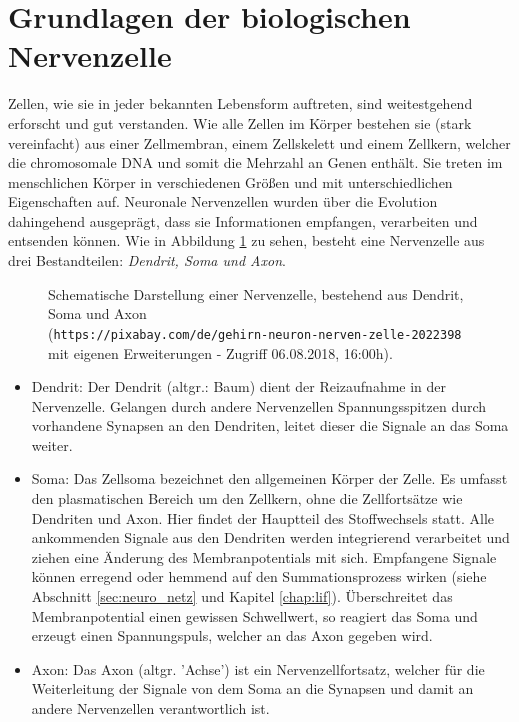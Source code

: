 \section{Grundlagen der biologischen Nervenzelle}
\label{sec:neuro_nervenzelle}
	Zellen, wie sie in jeder bekannten Lebensform auftreten, sind weitestgehend erforscht und gut verstanden. Wie alle Zellen im Körper bestehen sie (stark vereinfacht) aus einer Zellmembran, einem Zellskelett und einem Zellkern, welcher die chromosomale DNA und somit die Mehrzahl an Genen enthält. Sie treten im menschlichen Körper in verschiedenen Größen und mit unterschiedlichen Eigenschaften auf. Neuronale Nervenzellen wurden über die Evolution dahingehend ausgeprägt, dass sie Informationen empfangen, verarbeiten und entsenden können. Wie in Abbildung \ref{fig:neuron} zu sehen, besteht eine Nervenzelle aus drei Bestandteilen: \textit{Dendrit, Soma und Axon}.
	\begin{figure}[H] %
		\centering
		\def\svgwidth{12cm}
		
		\caption{Schematische Darstellung einer Nervenzelle, bestehend aus Dendrit, Soma und Axon\\(\texttt{https://pixabay.com/de/gehirn-neuron-nerven-zelle-2022398} mit eigenen Erweiterungen - Zugriff 06.08.2018, 16:00h).}
		\label{fig:neuron}
	\end{figure}
	\begin{itemize}
		\item Dendrit:
			\subitem Der Dendrit (altgr.: \glqq Baum\grqq) dient der Reizaufnahme in der Nervenzelle. Gelangen durch andere Nervenzellen Spannungsspitzen durch vorhandene Synapsen an den Dendriten, leitet dieser die Signale an das Soma weiter.
		\item Soma:
			\subitem Das Zellsoma bezeichnet den allgemeinen Körper der Zelle. Es umfasst den plasmatischen Bereich um den Zellkern, ohne die Zellfortsätze wie Dendriten und Axon. Hier findet der Hauptteil des Stoffwechsels statt. Alle ankommenden Signale aus den Dendriten werden integrierend verarbeitet und ziehen eine Änderung des Membranpotentials mit sich. Empfangene Signale können erregend oder hemmend auf den Summationsprozess wirken (siehe Abschnitt \ref{sec:neuro_netz} und Kapitel \ref{chap:lif}). Überschreitet das Membranpotential einen gewissen Schwellwert, so reagiert das Soma und erzeugt einen Spannungspuls, welcher an das Axon gegeben wird.
		\item Axon:
			\subitem Das Axon (altgr. 'Achse') ist ein Nervenzellfortsatz, welcher für die Weiterleitung der Signale von dem Soma an die Synapsen und damit an andere Nervenzellen verantwortlich ist.
	\end{itemize}
